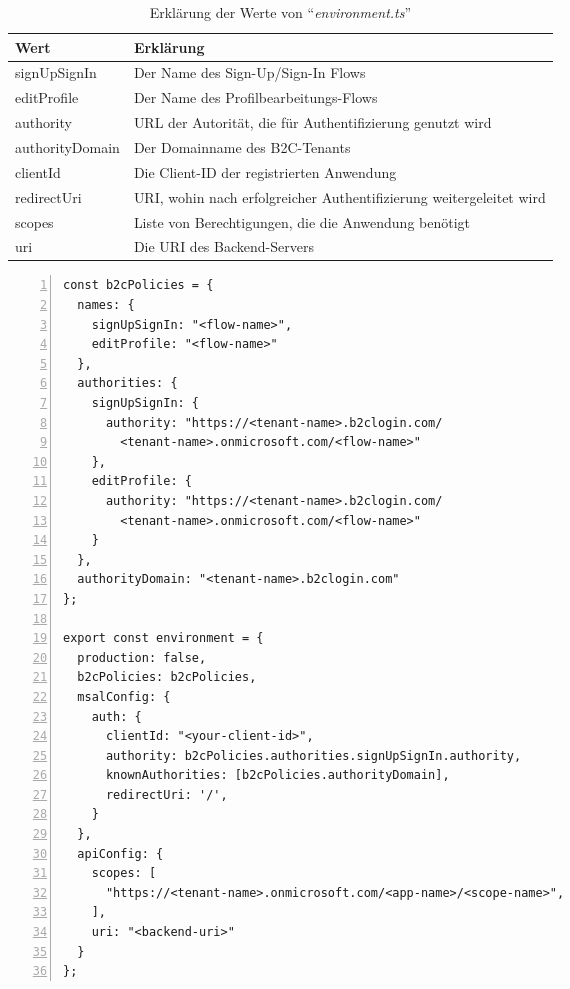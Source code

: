 \begin{table}[h t]
  \centering
  \caption{Erklärung der Werte von ``\emph{environment.ts}''}
  \label{tab:environment-ts}
  \begin{tabular}{|l|l|}
  \hline
  \textbf{Wert}   & \textbf{Erklärung}                                                  \\ \hline
  signUpSignIn    & Der Name des Sign-Up/Sign-In Flows                                  \\ \hline
  editProfile     & Der Name des Profilbearbeitungs-Flows                               \\ \hline
  authority       & URL der Autorität, die für Authentifizierung genutzt wird           \\ \hline
  authorityDomain & Der Domainname des B2C-Tenants                                      \\ \hline
  clientId        & Die Client-ID der registrierten Anwendung                           \\ \hline
  redirectUri     & URI, wohin nach erfolgreicher Authentifizierung weitergeleitet wird \\ \hline
  scopes          & Liste von Berechtigungen, die die Anwendung benötigt                \\ \hline
  uri             & Die URI des Backend-Servers                                         \\ \hline
  \end{tabular}
\end{table}

\begin{lstlisting}[numbers=left,caption={environment.ts},label={lst:environment-ts}]
const b2cPolicies = {
  names: {
    signUpSignIn: "<flow-name>",
    editProfile: "<flow-name>"
  },
  authorities: {
    signUpSignIn: {
      authority: "https://<tenant-name>.b2clogin.com/
        <tenant-name>.onmicrosoft.com/<flow-name>"
    },
    editProfile: {
      authority: "https://<tenant-name>.b2clogin.com/
        <tenant-name>.onmicrosoft.com/<flow-name>"
    }
  },
  authorityDomain: "<tenant-name>.b2clogin.com"
};
    
export const environment = {
  production: false,
  b2cPolicies: b2cPolicies,
  msalConfig: {
    auth: {
      clientId: "<your-client-id>",
      authority: b2cPolicies.authorities.signUpSignIn.authority,
      knownAuthorities: [b2cPolicies.authorityDomain],
      redirectUri: '/',
    }
  },
  apiConfig: {
    scopes: [
      "https://<tenant-name>.onmicrosoft.com/<app-name>/<scope-name>",
    ],
    uri: "<backend-uri>"
  }
};    
\end{lstlisting}

